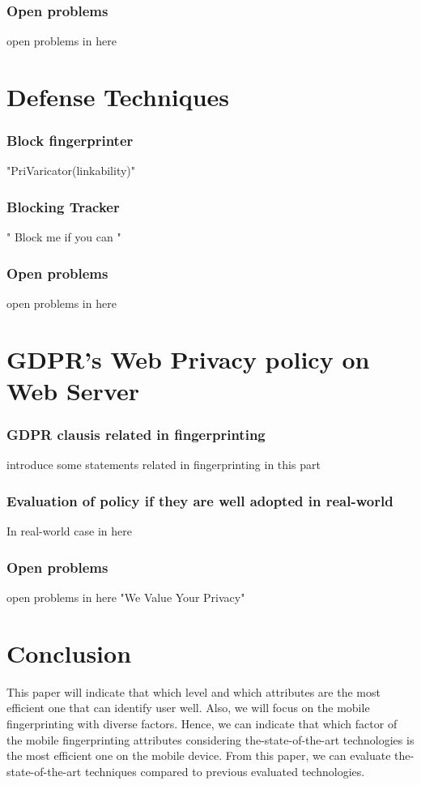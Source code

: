 \documentclass[sigconf]{acmart}   	%
\begin{document}
\subsubsection*{\bf Open problems}  
open problems in here

\section{Defense Techniques}
\subsubsection*{\bf Block fingerprinter}
"PriVaricator(linkability)"
\subsubsection*{\bf Blocking Tracker}   
" Block me if you can "
\subsubsection*{\bf Open problems}  
open problems in here

\section{GDPR's Web Privacy policy on Web Server}
\subsubsection*{\bf GDPR clausis related in fingerprinting}
introduce some statements related in fingerprinting in this part
\subsubsection*{\bf Evaluation of policy if they are well adopted in real-world}   
In real-world case in here
\subsubsection*{\bf Open problems}  
open problems in here "We Value Your Privacy"

\section{Conclusion}
This paper will indicate that which level and which attributes are the most efficient one that can identify user well. Also, we will focus on the mobile fingerprinting with diverse factors. Hence, we can indicate that which factor of the mobile fingerprinting attributes considering the-state-of-the-art technologies is the most efficient one on the mobile device. From this paper, we can evaluate the-state-of-the-art techniques compared to previous evaluated technologies. 

 
 
\end{document}
